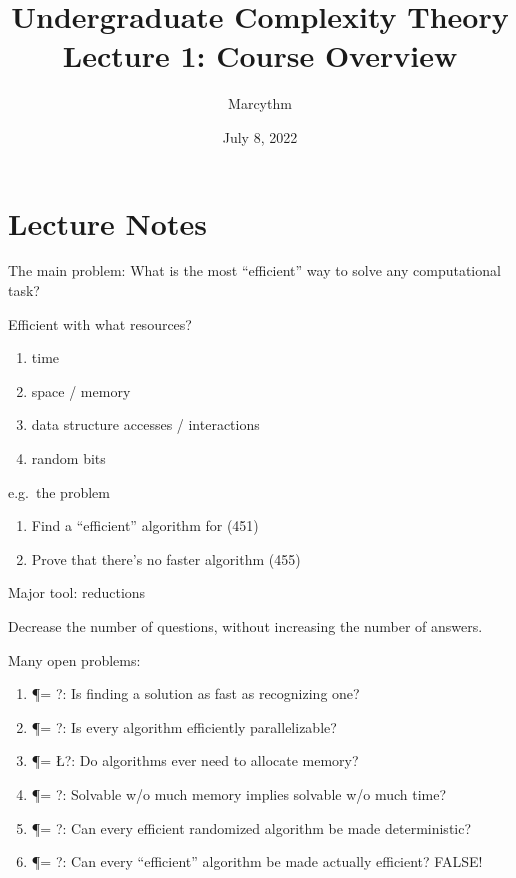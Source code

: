 \documentclass{article}
\title{Undergraduate Complexity Theory \\ Lecture 1: Course Overview}
\author{Marcythm}
\date{July 8, 2022}
\begin{document}
\maketitle{}

\section{Lecture Notes}

The main problem: What is the most ``efficient'' way to solve any computational task?

\begin{mdframed}
  Efficient with what resources?
  \begin{enumerate}
    \item time
    \item space / memory
    \item data structure accesses / interactions
    \item random bits
  \end{enumerate}
\end{mdframed}

\begin{mdframed}
  e.g.\ the  problem
  \begin{enumerate}
    \item Find a ``efficient'' algorithm for  (451)
    \item Prove that there's no faster algorithm (455)
  \end{enumerate}
\end{mdframed}

Major tool: reductions

\begin{remark}
  Decrease the number of questions, without increasing the number of answers.
\end{remark}

\begin{mdframed}
  Many open problems:
  \begin{enumerate}
    \item \P = \NP?: Is finding a solution as fast as recognizing one?
    \item \P = \NC?: Is every algorithm efficiently parallelizable?
    \item \P = \L?: Do algorithms ever need to allocate memory?
    \item \P = \PSPACE?: Solvable w/o much memory implies solvable w/o much time?
    \item \P = \BPP?: Can every efficient randomized algorithm be made deterministic?
    \item \P = ?: Can every ``efficient'' algorithm be made actually efficient? FALSE!
  \end{enumerate}
\end{mdframed}
\end{document}
